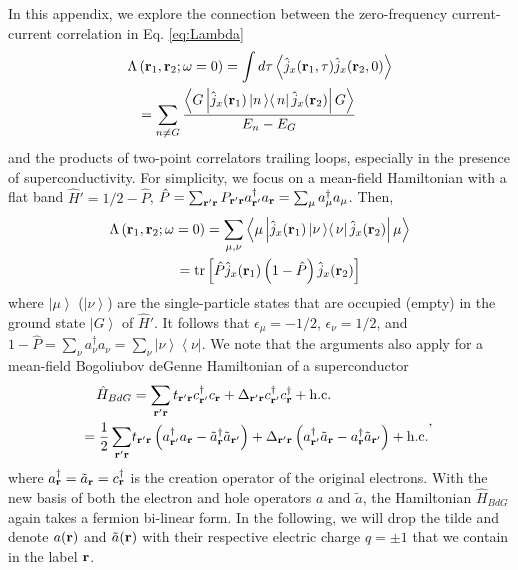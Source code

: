\documentclass[amsmath,amssymb, aps, prl, twocolumn]{revtex4-1}
\begin{document}
In this appendix, we explore the connection between the zero-frequency current-current correlation in Eq. \ref{eq:Lambda}
\begin{equation}
\left. \begin{aligned}
\Lambda&\left({\bf r}_1, {\bf r}_2;\omega=0\right) = \int d\tau \left\langle \hat{j}_x({\bf r}_1,\tau)\hat{j}_x({\bf r}_2,0) \right\rangle  \\
&=\sum_{n\ne G} \frac{\left\langle G \left| \hat{j}_x({\bf r}_1)  \left|n\left\rangle  \right\langle n\right| \hat{j}_x({\bf r}_2)\right| G\right\rangle}{E_n-E_G} 
\end{aligned}
\right.
\end{equation}
and the products of two-point correlators trailing loops, especially in the presence of superconductivity. For simplicity, we focus on a mean-field Hamiltonian with a flat band $\hat{H}'=1/2-\hat P$, $\hat P=\sum_{{\bf r}'{\bf r}}P_{{\bf r}'{\bf r}}a^\dagger_{{\bf r}'} a_{\bf r}=\sum_{\mu}a^\dagger_\mu a_\mu$. Then, 
\begin{equation}
\left. \begin{aligned}
\Lambda\left({\bf r}_1, {\bf r}_2;\omega=0\right)&
=\sum_{\mu, \nu}\left\langle \mu \left| \hat{j}_x({\bf r}_1)  \left|\nu\left\rangle  \right\langle \nu\right|\hat{j}_x({\bf r}_2)\right| \mu\right\rangle \\
= \mbox{tr}&\left[\hat{P} \hat{j}_x({\bf r}_1) \left(1-\hat{P}\right) \hat{j}_x({\bf r}_2)\right]
\end{aligned}
\right.
\label{eq:app1}
\end{equation}
where $\left|\mu\right\rangle$ ($\left|\nu\right\rangle$) are the single-particle states that are occupied (empty) in the ground state $\left|G\right\rangle$ of $\hat{H}'$. It follows that $\epsilon_\mu=-1/2$, $\epsilon_\nu=1/2$, and $1-\hat P=\sum_{\nu}a^\dagger_\nu a_\nu=\sum_{\nu}\left|\nu\right\rangle\left\langle\nu\right|$. We note that the arguments also apply for a mean-field Bogoliubov deGenne Hamiltonian of a superconductor
\begin{equation}
\left. \begin{aligned}
\hat{H}_{BdG} & =  \sum_{\bf{r}'\bf{r}}t_{\bf{r}'\bf{r}}c_{\bf{r}'}^{\dagger}c_{\bf{r}}+\Delta_{\bf{r}'\bf{r}}c_{\bf{r}'}^{\dagger}c_{\bf{r}}^{\dagger}+\mbox{h.c.}\\
=\frac{1}{2}\sum_{\bf{r}'\bf{r}}&t_{\bf{r}'\bf{r}}\left(a_{\bf{r}'}^{\dagger}a_{\bf{r}}-\tilde{a}_{\bf{r}}^{\dagger}\tilde{a}_{\bf{r}'}\right)
+\Delta_{\bf{r}'\bf{r}}\left(a_{\bf{r}'}^{\dagger}\tilde{a}_{\bf{r}}-a_{\bf{r}}^{\dagger}\tilde{a}_{\bf{r}'}\right)+\mbox{h.c.}
\end{aligned},
\right.
\end{equation}
where $a_{\bf{r}}^\dagger=\tilde{a}_{\bf{r}}=c_{\bf{r}}^\dagger$ is the creation operator of the original electrons. With the new basis of both the electron and hole operators $a$ and $\tilde{a}$, the Hamiltonian $\hat{H}_{BdG}$ again takes a fermion bi-linear form. In the following, we will drop the tilde and denote $a(\bf{r})$ and $\tilde{a}(\bf{r})$ with their respective electric charge $q=\pm 1$ that we contain in the label $\bf{r}$.
\end{document}
